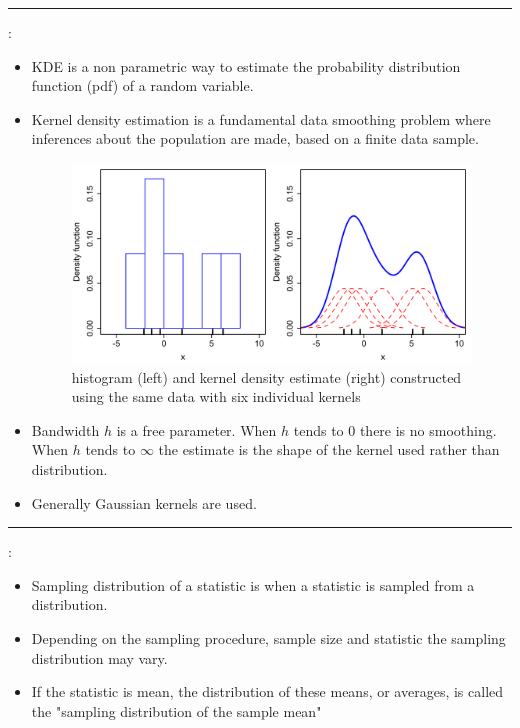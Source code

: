 \documentclass[	DIV=calc,%
paper=a4,%
fontsize=11pt,%
twocolumn]{scrartcl} %
\newcommand{\hformbar}[1]{\vspace{5pt}\hrule\vspace{10pt}} %
\newcommand{\formdesc}[1]{\noindent\textbf{#1}}
\begin{document}
\hformbar

\formdesc{KDE (Kernel density estimation)}:
\begin{itemize}
	\item KDE is a non parametric way to estimate the probability distribution function (pdf) of a random variable.
	\item Kernel density estimation is a fundamental data smoothing problem where inferences about the population are made, based on a finite data sample.
		\begin{figure}[ht!]
		\centering
		\caption{histogram (left) and kernel density estimate (right) constructed using the same data with six individual kernels}
		\graphicspath{ {images/math/} }
		\includegraphics[width=\linewidth]{comparison_of_1d_histogram_and_kde.png}
	\end{figure}
	\item Bandwidth $h$ is a free parameter. When $h$ tends to 0 there is no smoothing. When $h$ tends to $\infty$ the estimate is the shape of the kernel used rather than distribution.
	\item Generally Gaussian kernels are used.
\end{itemize}


\hformbar

\formdesc{Sampling Distribution}:
\begin{itemize}
	\item Sampling distribution of a statistic is when a statistic is sampled from a distribution.
	\item Depending on the sampling procedure, sample size and statistic the sampling distribution may vary.
	\item If the statistic is mean, the distribution of these means, or averages, is called the "sampling distribution of the sample mean"
\end{itemize}
\end{document}
